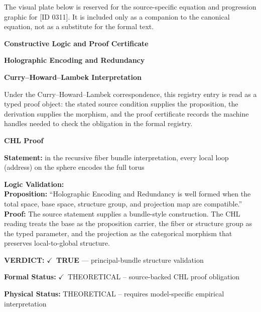 \begingroup\footnotesize\sloppy
The visual plate below is reserved for the source-specific equation and progression graphic for [ID 0311]. It is included only as a companion to the canonical equation, not as a substitute for the formal text.
\par\endgroup
\ifTZPDarkEdition
{}
\fi

\clearpage
\begingroup\tzpsupportsetup
\noindent\textbf{\fontsize{10.8pt}{12.8pt}\selectfont [ID 0311] Constructive Logic and Proof Certificate}\par
\noindent\textbf{\fontsize{10pt}{12pt}\selectfont Holographic Encoding and Redundancy}\par
\vspace{0.45em}
\begingroup
\footnotesize
\setlength{\parskip}{0.22em}
\setlength{\parindent}{0pt}
\noindent\textbf{Curry--Howard--Lambek Interpretation}\par
Under the Curry--Howard--Lambek correspondence, this registry entry is read as a typed proof
object: the stated source condition supplies the proposition, the derivation supplies the
morphism, and the proof certificate records the machine handles needed to check the obligation
in the formal registry.

\vspace{0.45em}
\noindent\textbf{CHL Proof}\par
\textbf{Statement:} in the recursive fiber bundle interpretation, every local loop (address) on the sphere
encodes the full torus

\textbf{Logic Validation:}\\
\textbf{Proposition:} ``Holographic Encoding and Redundancy is well formed when the total space, base space,
structure group, and projection map are compatible.''\\
\textbf{Proof:} The source statement supplies a bundle-style construction. The CHL reading treats the
base as the proposition carrier, the fiber or structure group as the typed parameter,
and the projection as the categorical morphism that preserves local-to-global structure.

\textbf{VERDICT:} \ensuremath{\checkmark}\ \textbf{TRUE} --- principal-bundle structure validation

\textbf{Formal Status:} \ensuremath{\checkmark}\ THEORETICAL -- source-backed CHL proof obligation

\textbf{Physical Status:} THEORETICAL -- requires model-specific empirical interpretation
\par\vspace{0.45em}
\par
\ifTZPDarkEdition
{}
\fi
\endgroup
\endgroup
